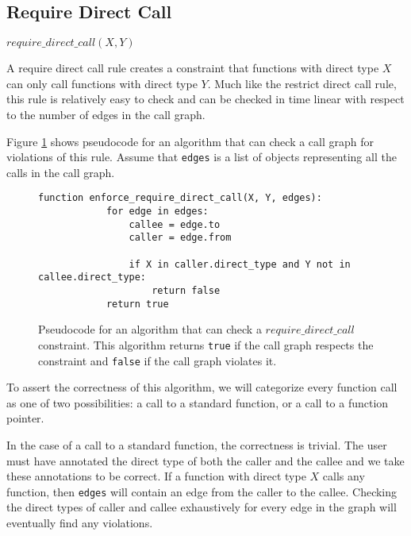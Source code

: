 \subsection{Require Direct Call}

\begin{center}
    $require\_direct\_call(X, Y)$
\end{center}

A require direct call rule creates a constraint that functions with direct type $X$ can only call functions with direct type $Y$. Much like the restrict direct call rule, this rule is relatively easy to check and can be checked in time linear with respect to the number of edges in the call graph.

Figure \ref{lst:rules:rules:require_direct_call} shows pseudocode for an algorithm that can check a call graph for violations of this rule.  Assume that \lstinline{edges} is a list of objects representing all the calls in the call graph.  

\begin{figure}
    \begin{lstlisting}[gobble=8]
        function enforce_require_direct_call(X, Y, edges):
            for edge in edges:
                callee = edge.to
                caller = edge.from

                if X in caller.direct_type and Y not in callee.direct_type:
                    return false
            return true
    \end{lstlisting}
    \caption{Pseudocode for an algorithm that can check a $require\_direct\_call$ constraint.  This algorithm returns \lstinline{true} if the call graph respects the constraint and \lstinline{false} if the call graph violates it.}
    \label{lst:rules:rules:require_direct_call}
\end{figure}

To assert the correctness of this algorithm, we will categorize every function call as one of two possibilities: a call to a standard function, or a call to a function pointer.

In the case of a call to a standard function, the correctness is trivial.  The user must have annotated the direct type of both the caller and the callee and we take these annotations to be correct.  If a function with direct type $X$ calls any function, then \lstinline{edges} will contain an edge from the caller to the callee.  Checking the direct types of caller and callee exhaustively for every edge in the graph will eventually find any violations.

